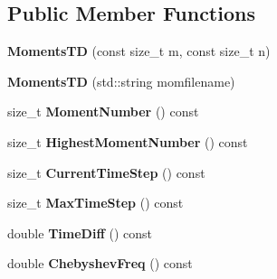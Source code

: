 \subsection*{Public Member Functions}
\begin{DoxyCompactItemize}
\item 
{\bfseries Moments\+TD} (const size\+\_\+t m, const size\+\_\+t n)\hypertarget{classchebyshev_1_1_moments_t_d_acdba269d058b70857247352aa3b47e33}{}\label{classchebyshev_1_1_moments_t_d_acdba269d058b70857247352aa3b47e33}

\item 
{\bfseries Moments\+TD} (std\+::string momfilename)\hypertarget{classchebyshev_1_1_moments_t_d_a9ac2ddc9460bed6c639af179f732c65c}{}\label{classchebyshev_1_1_moments_t_d_a9ac2ddc9460bed6c639af179f732c65c}

\item 
size\+\_\+t {\bfseries Moment\+Number} () const \hypertarget{classchebyshev_1_1_moments_t_d_a3a0b989f9e8f5133ab8a31a67a8838a7}{}\label{classchebyshev_1_1_moments_t_d_a3a0b989f9e8f5133ab8a31a67a8838a7}

\item 
size\+\_\+t {\bfseries Highest\+Moment\+Number} () const \hypertarget{classchebyshev_1_1_moments_t_d_a155e40d181a841fa0e74fbd937be8a1d}{}\label{classchebyshev_1_1_moments_t_d_a155e40d181a841fa0e74fbd937be8a1d}

\item 
size\+\_\+t {\bfseries Current\+Time\+Step} () const \hypertarget{classchebyshev_1_1_moments_t_d_a50fc1e96dd08b5747b33545b36c0be09}{}\label{classchebyshev_1_1_moments_t_d_a50fc1e96dd08b5747b33545b36c0be09}

\item 
size\+\_\+t {\bfseries Max\+Time\+Step} () const \hypertarget{classchebyshev_1_1_moments_t_d_acec2e83ed37f21c275cba99c407660c5}{}\label{classchebyshev_1_1_moments_t_d_acec2e83ed37f21c275cba99c407660c5}

\item 
double {\bfseries Time\+Diff} () const \hypertarget{classchebyshev_1_1_moments_t_d_a03c08c0440b106919f85da1b67406626}{}\label{classchebyshev_1_1_moments_t_d_a03c08c0440b106919f85da1b67406626}

\item 
double {\bfseries Chebyshev\+Freq} () const \hypertarget{classchebyshev_1_1_moments_t_d_a64c512d40aad4baa6eac98f75d684272}{}\label{classchebyshev_1_1_moments_t_d_a64c512d40aad4baa6eac98f75d684272}


\end{DoxyCompactItemize}
